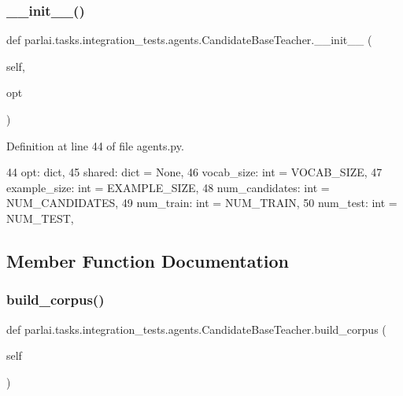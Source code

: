 \subsubsection{\texorpdfstring{\+\_\+\+\_\+init\+\_\+\+\_\+()}{\_\_init\_\_()}}
{\footnotesize\ttfamily def parlai.\+tasks.\+integration\+\_\+tests.\+agents.\+Candidate\+Base\+Teacher.\+\_\+\+\_\+init\+\_\+\+\_\+ (\begin{DoxyParamCaption}\item[{}]{self,  }\item[{}]{opt }\end{DoxyParamCaption})}



Definition at line 44 of file agents.\+py.


\begin{DoxyCode}
44         opt: dict,
45         shared: dict = \textcolor{keywordtype}{None},
46         vocab\_size: int = VOCAB\_SIZE,
47         example\_size: int = EXAMPLE\_SIZE,
48         num\_candidates: int = NUM\_CANDIDATES,
49         num\_train: int = NUM\_TRAIN,
50         num\_test: int = NUM\_TEST,
\end{DoxyCode}


\subsection{Member Function Documentation}
\mbox{\label{classparlai_1_1tasks_1_1integration__tests_1_1agents_1_1CandidateBaseTeacher_acc36b2f9fb42b69b2e0da43f398fdb47}} 
\subsubsection{\texorpdfstring{build\+\_\+corpus()}{build\_corpus()}}
{\footnotesize\ttfamily def parlai.\+tasks.\+integration\+\_\+tests.\+agents.\+Candidate\+Base\+Teacher.\+build\+\_\+corpus (\begin{DoxyParamCaption}\item[{}]{self }\end{DoxyParamCaption})}

